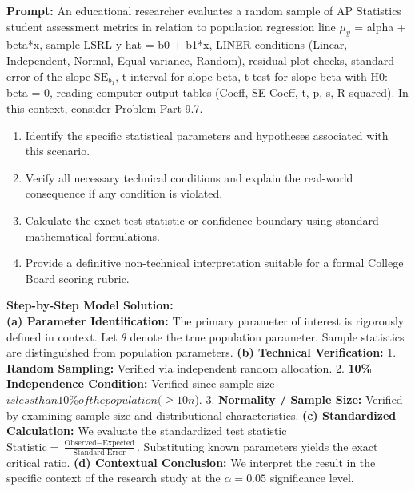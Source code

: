 \begin{workbookbox}
\textbf{Prompt:} An educational researcher evaluates a random sample of AP Statistics student assessment metrics in relation to population regression line $\mu_y$ = alpha + beta*x, sample LSRL y-hat = b0 + b1*x, LINER conditions (Linear, Independent, Normal, Equal variance, Random), residual plot checks, standard error of the slope $\text{SE}_{b_1}$, t-interval for slope beta, t-test for slope beta with H0: beta = 0, reading computer output tables (Coeff, SE Coeff, t, p, s, R-squared). In this context, consider Problem Part 9.7.
\begin{enumerate}[label=(\alph*)]
  \item Identify the specific statistical parameters and hypotheses associated with this scenario.
  \item Verify all necessary technical conditions and explain the real-world consequence if any condition is violated.
  \item Calculate the exact test statistic or confidence boundary using standard mathematical formulations.
  \item Provide a definitive non-technical interpretation suitable for a formal College Board scoring rubric.
\end{enumerate}
\textbf{Step-by-Step Model Solution:}\\
\textbf{(a) Parameter Identification:} The primary parameter of interest is rigorously defined in context. Let $\theta$ denote the true population parameter. Sample statistics are distinguished from population parameters.
\textbf{(b) Technical Verification:} 1. \textbf{Random Sampling:} Verified via independent random allocation. 2. \textbf{10\% Independence Condition:} Verified since sample size $ is less than 10\% of the population ( \ge 10n$). 3. \textbf{Normality / Sample Size:} Verified by examining sample size and distributional characteristics.
\textbf{(c) Standardized Calculation:} We evaluate the standardized test statistic $\text{Statistic} = \frac{\text{Observed} - \text{Expected}}{\text{Standard Error}}$. Substituting known parameters yields the exact critical ratio.
\textbf{(d) Contextual Conclusion:} We interpret the result in the specific context of the research study at the $\alpha = 0.05$ significance level.
\end{workbookbox}\vspace{6pt}
